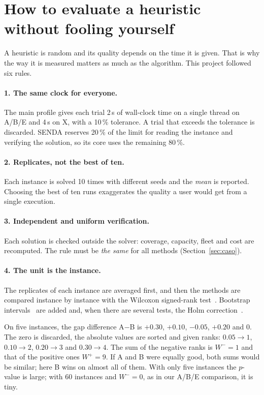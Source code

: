 \documentclass[11pt,a4paper]{article}
\begin{document}
\section{How to evaluate a heuristic without fooling yourself}
\label{sec:evaluar}

A heuristic is random and its quality depends on the time it is given. That is why the way it is
measured matters as much as the algorithm. This project followed six rules.

\paragraph{1. The same clock for everyone.} The main profile gives each trial 2\,s of wall-clock time
on a single thread on A/B/E and 4\,s on X, with a 10\,\% tolerance. A trial that exceeds the
tolerance is discarded. SENDA reserves 20\,\% of the limit for reading the instance and verifying the
solution, so its core uses the remaining 80\,\%.

\paragraph{2. Replicates, not the best of ten.} Each instance is solved 10 times with different seeds
and the \emph{mean} is reported. Choosing the best of ten runs exaggerates the quality a user would
get from a single execution.

\paragraph{3. Independent and uniform verification.} Each solution is checked outside the solver:
coverage, capacity, fleet and cost are recomputed. The rule must be \emph{the same} for all methods
(Section~\ref{sec:caso}).

\paragraph{4. The unit is the instance.} The replicates of each instance are averaged first, and then
the methods are compared instance by instance with the Wilcoxon signed-rank
test~\cite{wilcoxon1945}. Bootstrap intervals~\cite{efron1979} are added and, when there are several
tests, the Holm correction~\cite{holm1979}.

\begin{ejemplo}
On five instances, the gap difference A$-$B is $+0.30$, $+0.10$, $-0.05$, $+0.20$ and $0$. The zero is
discarded, the absolute values are sorted and given ranks: $0.05\to1$, $0.10\to2$, $0.20\to3$ and
$0.30\to4$. The sum of the negative ranks is $W^-=1$ and that of the positive ones $W^+=9$. If A and B
were equally good, both sums would be similar; here B wins on almost all of them. With only five
instances the $p$-value is large; with 60 instances and $W^-=0$, as in our A/B/E comparison, it is
tiny.
\end{ejemplo}
\end{document}
